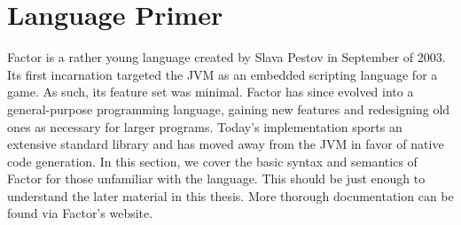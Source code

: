 \documentclass[11pt]{article}
\begin{document}
\section{Language Primer}


Factor is a rather young language created by Slava Pestov in September of 2003.
Its first incarnation targeted the \gls{JVM} as an embedded scripting language
for a game.  As such, its feature set was minimal.  Factor has since evolved
into a general-purpose programming language, gaining new features and
redesigning old ones as necessary for larger programs.  Today's implementation
sports an extensive standard library and has moved away from the \gls{JVM} in
favor of native code generation.  In this section, we cover the basic syntax and semantics of Factor for those
unfamiliar with the language.  This should be just enough to understand the
later material in this thesis.  More thorough documentation
can be found via Factor's website.
\end{document}

